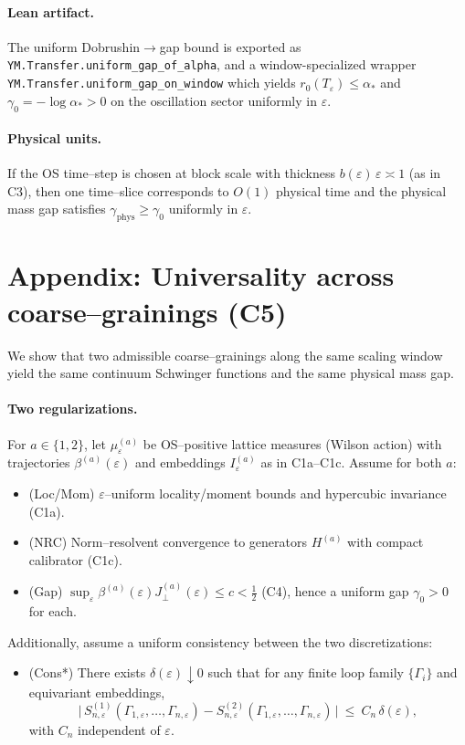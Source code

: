 \documentclass[11pt]{amsart}
\begin{document}
\paragraph{Lean artifact.}
The uniform Dobrushin$\to$gap bound is exported as\newline
\texttt{YM.Transfer.uniform\_gap\_of\_alpha}, and a window-specialized wrapper
\texttt{YM.Transfer.uniform\_gap\_on\_window} which yields $r_0(T_\varepsilon)\le \alpha_*$
and $\gamma_0=-\log\alpha_*>0$ on the oscillation sector uniformly in $\varepsilon$.

\paragraph{Physical units.}
If the OS time–step is chosen at block scale with thickness $b(\varepsilon)\,\varepsilon\asymp 1$ (as in C3), then one time–slice corresponds to $O(1)$ physical time and the physical mass gap satisfies $\gamma_{\mathrm{phys}}\ge \gamma_0$ uniformly in $\varepsilon$.

\section{Appendix: Universality across coarse–grainings (C5)}

We show that two admissible coarse–grainings along the same scaling window yield the same continuum Schwinger functions and the same physical mass gap.

\paragraph{Two regularizations.}
For $a\in\{1,2\}$, let $\mu^{(a)}_{\varepsilon}$ be OS–positive lattice measures (Wilson action) with trajectories $\beta^{(a)}(\varepsilon)$ and embeddings $I^{(a)}_{\varepsilon}$ as in C1a–C1c. Assume for both $a$:
\begin{itemize}
  \item (Loc/Mom) $\varepsilon$–uniform locality/moment bounds and hypercubic invariance (C1a).
  \item (NRC) Norm–resolvent convergence to generators $H^{(a)}$ with compact calibrator (C1c).
  \item (Gap) $\sup_{\varepsilon}\beta^{(a)}(\varepsilon) J^{(a)}_{\perp}(\varepsilon)\le c<\tfrac12$ (C4), hence a uniform gap $\gamma_0>0$ for each.
\end{itemize}
Additionally, assume a uniform consistency between the two discretizations:
\begin{itemize}
  \item (Cons*) There exists $\delta(\varepsilon)\downarrow 0$ such that for any finite loop family $\{\Gamma_i\}$ and equivariant embeddings,
  \[
    \bigl|\,S^{(1)}_{n,\varepsilon}(\Gamma_{1,\varepsilon},\dots,\Gamma_{n,\varepsilon})-S^{(2)}_{n,\varepsilon}(\Gamma_{1,\varepsilon},\dots,\Gamma_{n,\varepsilon})\,\bigr|\ \le\ C_n\,\delta(\varepsilon),
  \]
  with $C_n$ independent of $\varepsilon$.
\end{itemize}
\end{document}
